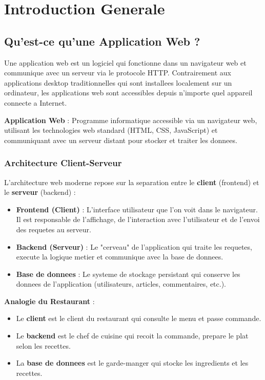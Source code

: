 \documentclass[a4paper,12pt]{book}
\begin{document}
\chapter{Introduction Generale}

\section{Qu'est-ce qu'une Application Web ?}

Une application web est un logiciel qui fonctionne dans un navigateur web et communique avec un serveur via le protocole HTTP. Contrairement aux applications desktop traditionnelles qui sont installees localement sur un ordinateur, les applications web sont accessibles depuis n'importe quel appareil connecte a Internet.

\begin{definitionbox}
    \textbf{Application Web} : Programme informatique accessible via un navigateur web, utilisant les technologies web standard (HTML, CSS, JavaScript) et communiquant avec un serveur distant pour stocker et traiter les donnees.
\end{definitionbox}

\subsection{Architecture Client-Serveur}

L'architecture web moderne repose sur la separation entre le \textbf{client} (frontend) et le \textbf{serveur} (backend) :

\begin{itemize}
    \item \textbf{Frontend (Client)} : L'interface utilisateur que l'on voit dans le navigateur. Il est responsable de l'affichage, de l'interaction avec l'utilisateur et de l'envoi des requetes au serveur.
    \item \textbf{Backend (Serveur)} : Le "cerveau" de l'application qui traite les requetes, execute la logique metier et communique avec la base de donnees.
    \item \textbf{Base de donnees} : Le systeme de stockage persistant qui conserve les donnees de l'application (utilisateurs, articles, commentaires, etc.).
\end{itemize}

\begin{analogybox}
    \textbf{Analogie du Restaurant} :
    \begin{itemize}
        \item Le \textbf{client} est le client du restaurant qui consulte le menu et passe commande.
        \item Le \textbf{backend} est le chef de cuisine qui recoit la commande, prepare le plat selon les recettes.
        \item La \textbf{base de donnees} est le garde-manger qui stocke les ingredients et les recettes.
    \end{itemize}
\end{analogybox}
\end{document}
